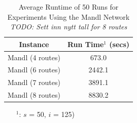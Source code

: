 \begin{table}[H]
    \centering
    \hspace*{-1.0cm}
    \begin{tabular}{|c|c|}
        \hline
        \textbf{Instance} & \textbf{Run Time$^1$ (secs)}\\
        \hline
        Mandl (4 routes) & 673.0\\
        \hline
        Mandl (6 routes) & 2442.1\\
        \hline
        Mandl (7 routes) & 3891.1\\
        \hline
        Mandl (8 routes) & 8830.2\\
        \hline
    \end{tabular}
    \caption{Average Runtime of 50 Runs for Experiments Using the Mandl Network \emph{\color{blue} TODO: Sett inn nytt tall for 8 routes}}
    \begin{itemize}[noitemsep]
    \item[$^1$:] $s$ = 50, $i$ = 125)
    \end{itemize} 
    \label{tabel:runTimeMandl}
\end{table}


